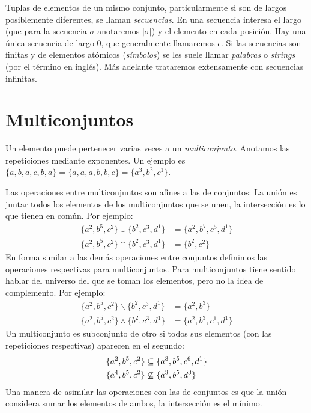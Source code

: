   Tuplas de elementos de un mismo conjunto,
  particularmente si son de largos posiblemente diferentes,
  se llaman \emph{secuencias}.%
  En una secuencia interesa el largo
  (que para la secuencia \(\sigma\)
   anotaremos \(\lvert \sigma \rvert\))%
  y el elemento en cada posición.
  Hay una única secuencia de largo 0,
  que generalmente llamaremos \(\epsilon\).%
  Si las secuencias son finitas y de elementos atómicos
  (\emph{símbolos})
  se les suele llamar \emph{palabras}
  o \emph{\foreignlanguage{english}{strings}}
  (por el término en inglés).
  Más adelante trataremos extensamente con secuencias infinitas.

\section{Multiconjuntos}
\label{sec:preliminares-multiconjuntos}

  Un elemento puede pertenecer varias veces
  a un \emph{multiconjunto}.
  Anotamos las repeticiones mediante exponentes.
  Un ejemplo
  es \(\{a, b, a, c, b, a\}
	 = \{a, a, a, b, b, c\}
	 = \{a^3, b^2, c^1\}\).

  Las operaciones entre multiconjuntos
  son afines a las de conjuntos:%
  La unión es juntar todos los elementos
  de los multiconjuntos que se unen,
  la intersección es lo que tienen en común.
  Por ejemplo:
  \begin{align*}
    \{a^2, b^5, c^2\} \cup \{b^2, c^3, d^1\}
      &= \{a^2, b^7, c^5, d^1\} \\
    \{a^2, b^5, c^2\} \cap \{b^2, c^3, d^1\}
      &= \{b^2, c^2\}
  \end{align*}
  En forma similar a las demás operaciones entre conjuntos
  definimos las operaciones respectivas para multiconjuntos.
  Para multiconjuntos tiene sentido hablar del universo
  del que se toman los elementos,
  pero no la idea de complemento.
  Por ejemplo:
  \begin{align*}
    \{a^2, b^5, c^2\} \smallsetminus \{b^2, c^3, d^1\}
      &= \{a^2, b^3\} \\
    \{a^2, b^5, c^2\} \vartriangle \{b^2, c^3, d^1\}
      &= \{a^2, b^3, c^1, d^1\}
  \end{align*}
  Un multiconjunto es subconjunto de otro
  si todos sus elementos
  (con las repeticiones respectivas)
  aparecen en el segundo:
  \begin{align*}
    \{a^2, b^5, c^2\}
      &\subseteq \{a^3, b^5, c^6, d^1\} \\
    \{a^4, b^5, c^2\}
      &\centernot\subseteq \{a^3, b^5, d^3\}
  \end{align*}
  Una manera de asimilar las operaciones con las de conjuntos
  es que la unión considera sumar los elementos de ambos,
  la intersección es el mínimo.

